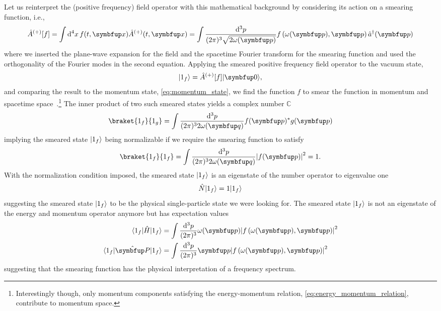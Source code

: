Let us reinterpret the (positive frequency) field operator with this mathematical background by considering its action on a smearing function, i.e.,
\begin{equation}
	\hat{A}^{(+)}[f]
	=
	\int\dd[4]{x}
	f(t,\vb{x})
	\hat{A}^{(+)}(t,\vb{x})
	=
	\int\frac{\dd[3]{p}}{(2\pi)^3\sqrt{2\omega(\vb{p})}}
	f\left(\omega(\vb{p}),\vb{p}\right)
	\hat{a}^\dagger(\vb{p})
\end{equation}
where we inserted the plane-wave expansion for the field and the spacetime Fourier transform for the smearing function and used the orthogonality of the Fourier modes in the second equation.
Applying the smeared positive frequency field operator to the vacuum state,
\begin{equation}
	\begin{split}
		\ket{1_f}
		=
		\hat{A}^{(+)}[f]
		\vacket
		,
	\end{split}
	\label{eq:single_particle_state}
\end{equation}
and comparing the result to the momentum state, \cref{eq:momentum_state}, we find the function $f$ to smear the function in momentum and spacetime space~\cite[p.~35]{Srednicki2007}.\footnote{Interestingly though, only momentum components satisfying the energy-momentum relation, \cref{eq:energy_momentum_relation}, contribute to momentum space.}
The inner product of two such smeared states yields a complex number $\mathbb{C}$
\begin{equation}
	\braket{1_f}{1_g}
	=
	\int\frac{\dd[3]{p}}{(2\pi)^32\omega(\vb{q})}
	f(\vb{p})^*
	g(\vb{p})
\end{equation}
implying the smeared state $\lvert1_f\rangle$ being normalizable if we require the smearing function to satisfy
\begin{equation}
	\braket{1_f}{1_f}
	=
	\int\frac{\dd[3]{p}}{(2\pi)^32\omega(\vb{q})}
	\abs*{f(\vb{p})}^2
	=
	1
	\label{eq:spectrum_normalization}
	.
\end{equation}
With the normalization condition imposed, the smeared state $\lvert1_f\rangle$ is an eigenstate of the number operator to eigenvalue one
\begin{equation}
	\hat{N}
	\lvert1_f\rangle
	=
	1
	\lvert1_f\rangle
\end{equation}
suggesting the smeared state $\lvert1_f\rangle$ to be the physical single-particle state we were looking for.
The smeared state $\lvert1_f\rangle$ is not an eigenstate of the energy and momentum operator anymore but has expectation values
\begin{align}
	\bra{1_f}
	\hat{H}
	\ket{1_f}
	&=
	\int\frac{\dd[3]{p}}{(2\pi)^3}
	\omega(\vb{p})
	\abs*{f\left(\omega(\vb{p}),\vb{p}\right)}^2
	\\
	\bra{1_f}
	\vu{P}
	\ket{1_f}
	&=
	\int\frac{\dd[3]{p}}{(2\pi)^3}
	\vb{p}
	\abs*{f\left(\omega(\vb{p}),\vb{p}\right)}^2
\end{align}
suggesting that the smearing function has the physical interpretation of a frequency spectrum.

